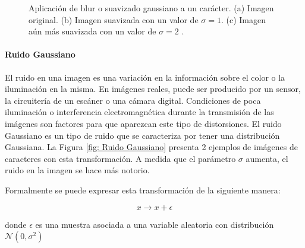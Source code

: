 		\begin{figure}[htbp]
			\centering
			\caption[Suavizado Gaussiano de un carácter]{Aplicación de blur o suavizado gaussiano a un carácter. (a) Imagen original. (b) Imagen suavizada con un valor de $\sigma = 1$.  (c) Imagen aún más suavizada con un valor de $\sigma = 2$ .}
			\label{fig: Suavizado Gaussiano}
		\end{figure}				
			
			
		\paragraph{Ruido Gaussiano}			
			
			El ruido en una imagen es una variación en la información sobre el color o la iluminación en la misma. En imágenes reales, puede ser producido por un sensor, la circuitería de un escáner o una cámara digital. Condiciones de poca iluminación o interferencia electromagnética durante la transmisión de las imágenes son factores para que aparezcan este tipo de distorsiones. El ruido Gaussiano es un tipo de ruido que se caracteriza por tener una distribución Gaussiana. La Figura \ref{fig: Ruido Gaussiano} presenta 2 ejemplos de imágenes de caracteres con esta transformación. A medida que el parámetro $\sigma$  aumenta, el ruido en la imagen se hace más notorio.
			
			Formalmente se puede expresar esta transformación de la siguiente manera:
			
			$$x \rightarrow x + \epsilon $$
			
			donde $\epsilon$ es una muestra asociada a una variable aleatoria con distribución $\mathcal{N}(0, \sigma^2)$
			
